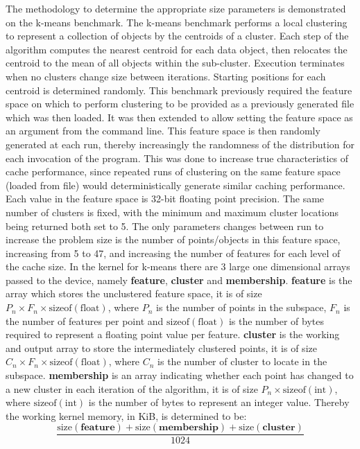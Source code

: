 \documentclass[../document.tex]{subfiles}
\begin{document}
The methodology to determine the appropriate size parameters is demonstrated on the k-means benchmark.
The k-means benchmark performs a local clustering to represent a collection of objects by the centroids of a cluster.
Each step of the algorithm computes the nearest centroid for each data object, then relocates the centroid to the mean of all objects within the sub-cluster.
Execution terminates when no clusters change size between iterations.
Starting positions for each centroid is determined randomly.
This benchmark previously required the feature space on which to perform clustering to be provided as a previously generated file which was then loaded.
It was then extended to allow setting the feature space as an argument from the command line.
This feature space is then randomly generated at each run, thereby increasingly the randomness of the distribution for each invocation of the program.
This was done to increase true characteristics of cache performance, since repeated runs of clustering on the same feature space (loaded from file) would deterministically generate similar caching performance.
Each value in the feature space is 32-bit floating point precision.
The same number of clusters is fixed, with the minimum and maximum cluster locations being returned both set to 5.
The only parameters changes between run to increase the problem size is the number of points/objects in this feature space, increasing from 5 to 47, and increasing the number of features for each level of the cache size.
In the kernel for k-means there are 3 large one dimensional arrays passed to the device, namely {\bf feature}, {\bf cluster} and {\bf membership}.
{\bf feature} is the array which stores the unclustered feature space, it is of size $P_n \times F_n \times \text{sizeof}\left(\text{float}\right)$, where $ P_n $ is the number of points in the subspace, $F_n$ is the number of features per point and $\text{sizeof}\left(\text{float}\right)$ is the number of bytes required to represent a floating point value per feature.
{\bf cluster} is the working and output array to store the intermediately clustered points, it is of size $C_n \times F_n \times \text{sizeof}\left(\text{float}\right)$, where $C_n$ is the number of cluster to locate in the subspace.
{\bf membership} is an array indicating whether each point has changed to a new cluster in each iteration of the algorithm, it is of size $P_n \times \text{sizeof}\left(\text{int}\right)$, where $\text{sizeof}\left(\text{int}\right)$ is the number of bytes to represent an integer value.
Thereby the working kernel memory, in KiB, is determined to be:
\begin{equation}
    \frac{\text{size}\left(\textbf{feature}\right)+\text{size}\left(\textbf{membership}\right)+\text{size}\left(\textbf{cluster}\right)}{1024}
    \label{eq:kmeans_size}
\end{equation}
\end{document}
